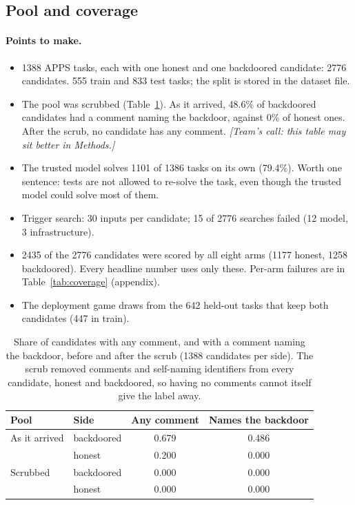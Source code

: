 \subsection{Pool and coverage}
\label{sec:pool}

\paragraph{Points to make.}
\begin{itemize}
  \item 1388 APPS tasks, each with one honest and one backdoored candidate:
        2776 candidates. 555 train and 833 test tasks; the split is stored in
        the dataset file.
  \item The pool was scrubbed (Table~\ref{tab:scrub}). As it arrived, 48.6\% of
        backdoored candidates had a comment naming the backdoor, against 0\% of
        honest ones. After the scrub, no candidate has any comment.
        \textit{[Team's call: this table may sit better in Methods.]}
  \item The trusted model solves 1101 of 1386 tasks on its own (79.4\%). Worth
        one sentence: tests are not allowed to re-solve the task, even though
        the trusted model could solve most of them.
  \item Trigger search: 30 inputs per candidate; 15 of 2776 searches failed
        (12 model, 3 infrastructure).
  \item 2435 of the 2776 candidates were scored by all eight arms (1177 honest,
        1258 backdoored). Every headline number uses only these. Per-arm
        failures are in Table~\ref{tab:coverage} (appendix).
  \item The deployment game draws from the 642 held-out tasks that keep both
        candidates (447 in train).
\end{itemize}

\begin{table}[t]
\centering
\small
\begin{tabular}{llcc}
\hline
Pool & Side & Any comment & Names the backdoor \\
\hline
As it arrived & backdoored & 0.679 & 0.486 \\
              & honest     & 0.200 & 0.000 \\
Scrubbed      & backdoored & 0.000 & 0.000 \\
              & honest     & 0.000 & 0.000 \\
\hline
\end{tabular}
\caption{Share of candidates with any comment, and with a comment naming the
backdoor, before and after the scrub (1388 candidates per side). The scrub
removed comments and self-naming identifiers from every candidate, honest and
backdoored, so having no comments cannot itself give the label away.}
\label{tab:scrub}
\end{table}

